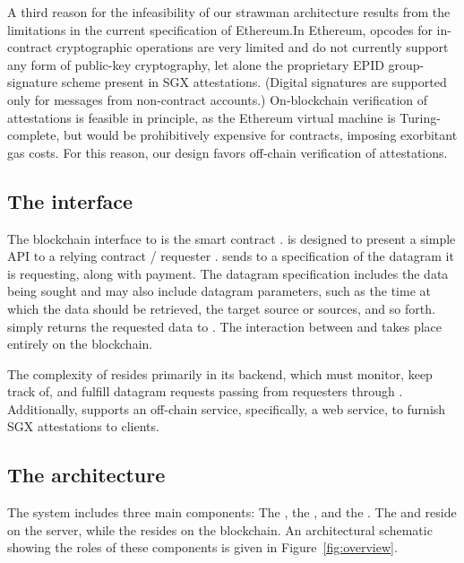 A third reason for the infeasibility of our strawman architecture results from the limitations in the current specification of Ethereum.In Ethereum, opcodes for in-contract cryptographic operations are very limited and do not currently support any form of public-key cryptography, let alone the proprietary EPID group-signature scheme present in SGX attestations. (Digital signatures are supported only for messages from non-contract accounts.) On-blockchain verification of attestations is feasible in principle, as the Ethereum virtual machine is Turing-complete, but would be prohibitively expensive for contracts, imposing exorbitant gas costs. For this reason, our \tc design favors off-chain verification of attestations.
\fi

\subsection{The \tc interface}

The blockchain interface to \tc is the smart contract \tcont. \tcont is designed to present a simple API to a relying contract / requester \reqcont. \reqcont sends to \tcont a specification of the datagram it is requesting, along with payment. The datagram specification includes the data being sought and may also include datagram parameters, such as the time at which the data should be retrieved, the target source or sources, and so forth. \tcont simply returns the requested data to \reqcont. The interaction between \reqcont and \tcont takes place entirely on the blockchain.

The complexity of \tc resides primarily in its backend, which must monitor, keep track of, and fulfill datagram requests passing from requesters through \tcont. Additionally, \tc supports an off-chain service, specifically, a web service, to furnish SGX attestations to clients.

\subsection{The \tc architecture}

The \tcs system includes three main components: The \tcontract, the \encname, and the \medname. The \encname and \medname reside on the \tc server, while the \tcontract resides on the blockchain. An architectural schematic showing the roles of these components is given in Figure~\ref{fig:overview}.

